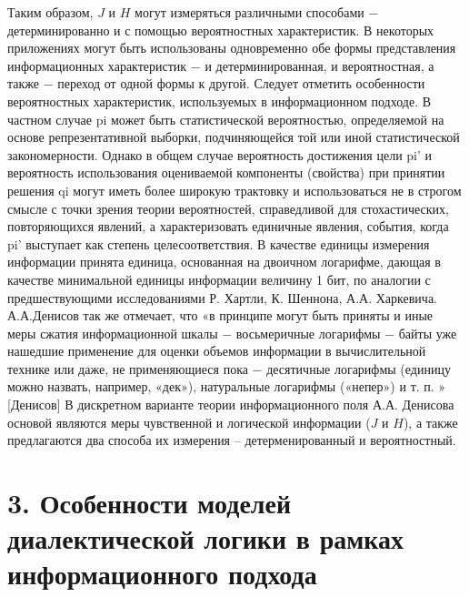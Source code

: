 \documentclass[a4paper,12pt]{report}
\begin{document}
	Таким образом, $J$ и $H$ могут измеряться различными способами − детерминированно и с помощью вероятностных характеристик. В некоторых приложениях могут быть использованы одновременно обе формы представления информационных характеристик − и детерминированная, и
вероятностная, а также − переход от одной формы к другой. Следует отметить особенности вероятностных характеристик, используемых в информационном подходе. В частном случае pi может быть статистической вероятностью, определяемой на основе репрезентативной выборки, подчиняющейся той или иной статистической закономерности. Однако в общем случае вероятность достижения цели pi' и вероятность использования оцениваемой компоненты (свойства) при принятии решения qi могут иметь более широкую трактовку и использоваться не в строгом смысле с точки зрения теории вероятностей, справедливой для стохастических, повторяющихся явлений, а характеризовать единичные явления, события, когда pi' выступает как степень целесоответствия. 	В качестве единицы измерения информации принята единица, основанная на двоичном логарифме, дающая в качестве минимальной единицы информации величину 1 бит, 	по аналогии с предшествующими исследованиями Р. Хартли, К. Шеннона, А.А. Харкевича. А.А.Денисов так же отмечает, что «в принципе могут быть приняты и иные меры сжатия информационной шкалы − восьмеричные логарифмы − байты  уже нашедшие применение для оценки объемов информации в вычислительной технике или даже, не применяющиеся пока − десятичные логарифмы (единицу можно назвать, например, «дек»), натуральные логарифмы («непер») и т. п. » [Денисов]
	В дискретном варианте теории информационного поля А.А. Денисова основой являются меры чувственной и логической информации ($J$ и $H$), а также предлагаются два способа их измерения – детерменированный и вероятностный.



\chapter*{3. Особенности моделей диалектической логики в рамках информационного подхода }
 \\
\end{document}
